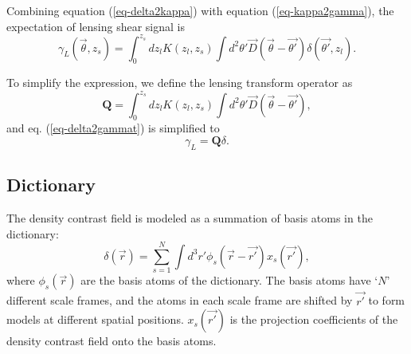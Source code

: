 \documentclass[twocolumn]{aastex62}
\begin{document}
Combining equation (\ref{eq-delta2kappa}) with equation (\ref{eq-kappa2gamma}),
the expectation of lensing shear signal is
\begin{equation}\label{eq-delta2gammat}
\gamma_L(\vec{\theta},z_s) = \int_0^{z_s} dz_l K(z_l,z_s) \int d^2 \theta' \vec{D}(\vec{\theta}-\vec{\theta'}) \delta(\vec{\theta'},z_l).
\end{equation}

To simplify the expression, we define the lensing transform operator as
\begin{equation}
\mathbf{Q}=\int_0^{z_s} dz_l K(z_l,z_s) \int d^2 \theta'  \vec{D}(\vec{\theta}-\vec{\theta'}),
\end{equation}
and eq. (\ref{eq-delta2gammat}) is simplified to
\begin{equation} \label{eq-delta2gammat-simp}
\gamma_L=\mathbf{Q}\delta.
\end{equation}

\subsection{Dictionary}
\label{subsec_method_dictionary}

The density contrast field is modeled as a summation of basis atoms in the
dictionary:
\begin{equation}\label{eq-x2delta}
\delta(\vec{r}) = \sum_{s=1}^{N} \int d^3 r' \phi_s(\vec{r}-\vec{r'}) x_s(\vec{r'}),
\end{equation}
where $\phi_s(\vec{r})$ are the basis atoms of the dictionary. The basis atoms
have `$N$' different scale frames, and the atoms in each scale frame are
shifted by $\vec{r'}$ to form models at different spatial positions.
$x_s(\vec{r'})$ is the projection coefficients of the density contrast field
onto the basis atoms.
\end{document}
